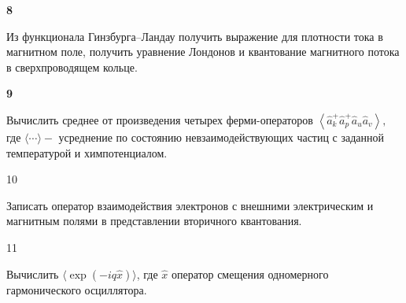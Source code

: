 \documentclass[a4paper,12pt]{article} %
\begin{document}
\begin{task} \textbf{8}



Из функционала Гинзбурга–Ландау получить выражение для плотности тока в магнитном поле, получить уравнение Лондонов и квантование магнитного потока в сверхпроводящем кольце.























\end{task}





\begin{task} \textbf{9}
	
	
Вычислить среднее от произведения четырех ферми-операторов  
$\left\langle\hat{a}_{k}^{+} \hat{a}_{p}^{+} \hat{a}_{u} \hat{a}_{v}\right\rangle,$ 
где $\langle\cdots\rangle-$ усреднение по состоянию невзаимодействующих частиц с заданной температурой и химпотенциалом.











\end{task}


\begin{task}

10

Записать оператор взаимодействия электронов с внешними электрическим и магнитным полями в представлении вторичного квантования.











\end{task}


\begin{task}

11

Вычислить  $\langle\exp (-i q \hat{x})\rangle$, где  $\hat{x}$ оператор смещения одномерного гармонического осциллятора.














\end{task}
\end{document}
